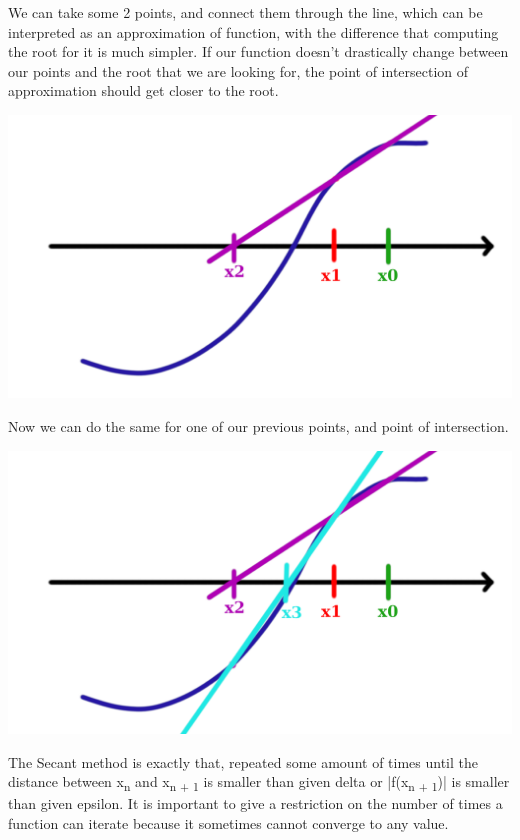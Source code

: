 \documentclass{article}
\begin{document}
We can take some 2 points, and connect them through the line, which can be interpreted as an approximation of function, with the difference that computing the root for it is much simpler. If our function doesn't drastically change between our points and the root that we are looking for, the point of intersection of approximation should get closer to the root.

\begin{center}
    \includegraphics[scale=0.3]{secant1}
\end{center}
Now we can do the same for one of our previous points, and point of intersection.

\begin{center}
    \includegraphics[scale=0.3]{secant2}
\end{center}

The Secant method is exactly that, repeated some amount of times until the distance between x\textsubscript{n} and x\textsubscript{n + 1} is smaller than given delta or |f(x\textsubscript{n + 1})| is smaller than given epsilon. It is important to give a restriction on the number of times a function can iterate because it sometimes cannot converge to any value.
\end{document}
